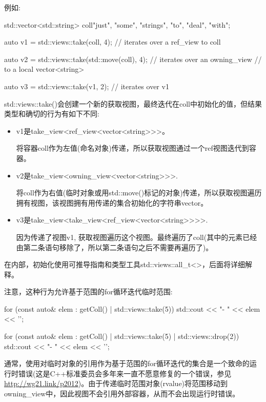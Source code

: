 例如:

\begin{cpp}
std::vector<std::string> coll{"just", "some", "strings", "to", "deal", "with"};

auto v1 = std::views::take(coll, 4); // iterates over a ref_view to coll

auto v2 = std::views::take(std::move(coll), 4); // iterates over an owning_view
// to a local vector<string>

auto v3 = std::views::take(v1, 2); // iterates over v1
\end{cpp}

std::views::take()会创建一个新的获取视图，最终迭代在coll中初始化的值，但结果类型和确切的行为有如下不同:

\begin{itemize}
\item
v1是take\_view<ref\_view<vector<string>{}>{}>。

将容器coll作为左值(命名对象)传递，所以获取视图通过一个ref视图迭代到容器。

\item
v2是take\_view<owning\_view<vector<string>{}>{}>.

将coll作为右值(临时对象或用std::move()标记的对象)传递，所以获取视图遍历拥有视图，该视图拥有用传递的集合初始化的字符串vector。

\item
v3是take\_view<take\_view<ref\_view<vector<string>{}>{}>{}>.

因为传递了视图v1, 获取视图遍历这个视图。最终遍历了coll(其中的元素已经由第二条语句移除了，所以第二条语句之后不需要再遍历了)。
\end{itemize}

在内部，初始化使用可推导指南和类型工具std::views::all\_t<>，后面将详细解释。

注意，这种行为允许基于范围的for循环迭代临时范围:

\begin{cpp}
for (const auto& elem : getColl() | std::views::take(5)) {
	std::cout << "- " << elem << '\n';
}

for (const auto& elem : getColl() | std::views::take(5) | std::views::drop(2)) {
	std::cout << "- " << elem << '\n';
}
\end{cpp}

通常，使用对临时对象的引用作为基于范围的for循环迭代的集合是一个致命的运行时错误(这是C++标准委员会多年来一直不愿意修复的一个错误，参见\url{http://wg21.link/p2012})。由于传递临时范围对象(rvalue)将范围移动到owning\_view中，因此视图不会引用外部容器，从而不会出现运行时错误。

